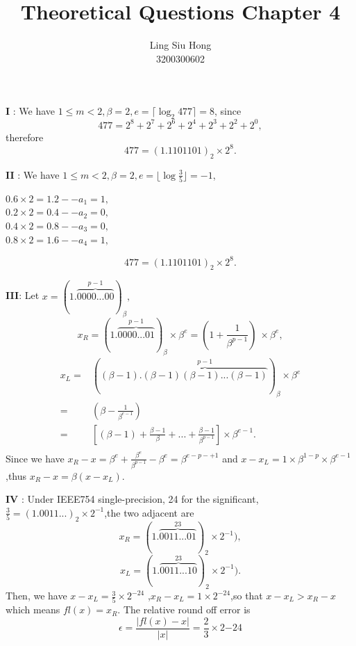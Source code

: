 \documentclass{article}
\title{\textbf{Theoretical Questions Chapter 4}}
\author{Ling Siu Hong \\ 3200300602}
\begin{document}
\maketitle

\textbf{I} : We have $1\leq m < 2, \beta = 2 , e = \lceil \log_2 477 \rceil = 8$, since
\begin{equation*}
    477 = 2^8 + 2^7 + 2^6 + 2^4 + 2^3 + 2^2 + 2^0 ,
\end{equation*}
therefore
\begin{equation*}
    477 = (1.1101101)_2 \times 2^8 .
\end{equation*}

\textbf{II} : We have $1\leq m < 2, \beta = 2 , e = \lfloor \log \frac{3}{5} \rfloor = -1$, \\
\begin{center}
    $0.6 \times 2 = 1.2  --a_1 = 1 ,$\\
    $0.2 \times 2 = 0.4  --a_2 = 0 ,$\\
    $0.4 \times 2 = 0.8  --a_3 = 0 ,$\\
    $0.8 \times 2 = 1.6  --a_4 = 1 ,$\\
\end{center}

\begin{equation*}
    477 = (1.1101101)_2 \times 2^8.
\end{equation*}


\textbf{III}: Let $x = (1.\overbrace{0000...00}^{p-1 })_{\beta},$
\begin{equation*}
    x_R = (1.\overbrace{0000...01}^{p-1 })_{\beta}\times \beta^e = (1 + \frac{1}{\beta^{p-1}})\ \times \beta^e,
\end{equation*}
\begin{align*}
    x_L =& ((\beta - 1).\overbrace{(\beta - 1)(\beta - 1)...(\beta-1)}^{p-1})_{\beta}  \times \beta^e \\
    =& (\beta - \frac{1}{\beta^{e-1}}) \\
    =& [(\beta - 1 ) + \frac{\beta -1}{\beta} + ... +\frac{\beta -1}{\beta^{p-1}} ]\times \beta^{e-1}. \\
\end{align*}
Since we have $x_R - x = \beta^e + \frac{\beta^e}{\beta^{p-1}} - \beta^e = \beta^{e-p-+1}$ and $x - x_L =  1 \times \beta^{1-p} \times \beta^{e-1}$,thus $x_R - x = \beta(x - x_L).$

\textbf{IV} : Under IEEE754 single-precision, 24 for the significant,
$\frac{3}{5} = (1.0011...)_2 \times 2^{-1} $,the two adjacent are 
\begin{equation*}
    x_R = (1.\overbrace{0011...01}^{23})_2 \times 2^{-1}),
\end{equation*}
\begin{equation*}
    x_L = (1.\overbrace{0011...10}^{23})_2 \times 2^{-1}).
\end{equation*}
Then, we have  $x-x_L = \frac{3}{5} \times 2^{-24}$ ,$x_R - x_L = 1 \times 2^{-24}$,so that $x - x_L > x_R - x$ which means $fl(x) = x_R$.
The relative round off error is 
\begin{equation*}
    \epsilon = \frac{\lvert fl(x) - x \rvert}{\lvert x \rvert} = \frac{2}{3} \times 2{-24} 
\end{equation*}
\end{document}
